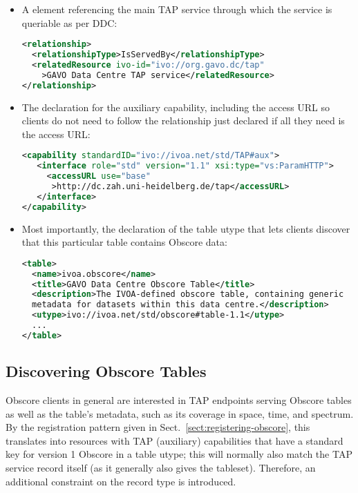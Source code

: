 \documentclass[11pt,a4paper]{ivoa}
\begin{document}
\begin{itemize}
\item A  element referencing the main TAP service
through which the service is queriable as per DDC:
\begin{lstlisting}[language=XML,basicstyle=\footnotesize]
<relationship>
  <relationshipType>IsServedBy</relationshipType>
  <relatedResource ivo-id="ivo://org.gavo.dc/tap"
    >GAVO Data Centre TAP service</relatedResource>
</relationship>
\end{lstlisting}

\item The declaration for the auxiliary capability, including the access
URL so clients do not need to follow the relationship just declared if
all they need is the access URL:
\begin{lstlisting}[language=XML,basicstyle=\footnotesize]
<capability standardID="ivo://ivoa.net/std/TAP#aux">
   <interface role="std" version="1.1" xsi:type="vs:ParamHTTP">
     <accessURL use="base"
      >http://dc.zah.uni-heidelberg.de/tap</accessURL>
   </interface>
</capability>
\end{lstlisting}

\item Most importantly, the declaration of the table utype that lets
clients discover that this particular table contains Obscore data:
\begin{lstlisting}[language=XML,basicstyle=\footnotesize]
<table>
  <name>ivoa.obscore</name>
  <title>GAVO Data Centre Obscore Table</title>
  <description>The IVOA-defined obscore table, containing generic
  metadata for datasets within this data centre.</description>
  <utype>ivo://ivoa.net/std/obscore#table-1.1</utype>
  ...
</table>
\end{lstlisting}
\end{itemize}

\subsection{Discovering Obscore Tables}
\label{sect:finding-obscore}

Obscore clients in general are interested in TAP endpoints serving Obscore
tables as well as the table's metadata, such as its coverage in space,
time, and spectrum.  By the  registration pattern given in
Sect.~\ref{sect:registering-obscore}, this translates into resources with TAP
(auxiliary) capabilities that have a standard key for version 1 Obscore
in a table utype; this will normally also match the TAP service record
itself (as it generally also gives the tableset). Therefore, an
additional constraint on the record type is introduced.
\end{document}
